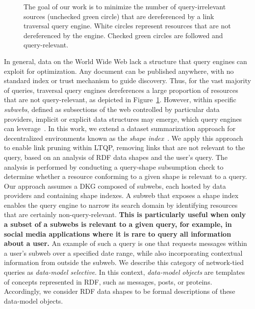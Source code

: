 \begin{figure}
    \centering
    
    \caption{
    The goal of our work is to minimize the number of query-irrelevant sources (unchecked green circle) that are dereferenced by a link traversal query engine.
    White circles represent resources that are not dereferenced by the engine.
    Checked green circles are followed and query-relevant.
    }
    \label{fig:situation}
\end{figure}

In general, data on the World Wide Web lack a structure that query engines can exploit for optimization.  
Any document can be published anywhere, with no standard index or trust mechanism to guide discovery.
Thus, for the vast majority of queries, traversal query engines dereferences a large proportion of resources that are not query-relevant, as depicted in Figure~\ref{fig:situation}.
However, within specific \emph{subwebs}, defined as subsections of the web controlled by particular data providers, implicit or explicit data structures may emerge, which query engines can leverage~\cite{Bogaerts2021LinkTW}.
In this work, we extend a dataset summarization approach for decentralized environments known as the \emph{shape index}~\cite{tam2024opportunitiesshapebasedoptimizationlink}.
We apply this approach to enable link pruning within LTQP, removing links that are not relevant to the query, based on an analysis of RDF data shapes and the user's query.
The analysis is performed by conducting a query-shape subsumption check to determine whether a resource conforming to a given shape is relevant to a query.
Our approach assumes a DKG composed of subwebs, each hosted by data providers and containing shape indexes.
A subweb that exposes a shape index enables the query engine to narrow its search domain by identifying resources that are certainly non-query-relevant.
\textbf{This is particularly useful when only a subset of a subwebs is relevant to a given query, for example, in social media applications where it is rare to query all information about a user.}
An example of such a query is one that requests messages within a user's subweb over a specified date range, while also incorporating contextual information from outside the subweb.
We describe this category of network-tied queries as \emph{data-model selective}. 
In this context, \emph{data-model objects} are templates of concepts represented in RDF, 
such as messages, posts, or proteins. 
Accordingly, we consider RDF data shapes to be formal descriptions of these data-model objects. 

